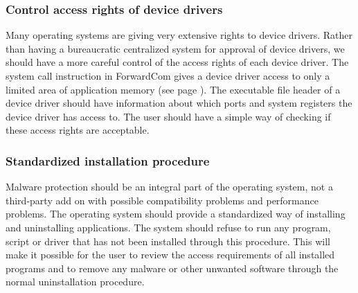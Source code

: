 \documentclass[forwardcom.tex]{subfiles}
\begin{document}
\subsubsection{Control access rights of device drivers} 
Many operating systems are giving very extensive rights to device drivers. Rather than having a bureaucratic centralized system for approval of device drivers, we should have a more careful control of the access rights of each device driver. The system call instruction in ForwardCom gives a device driver access to only a limited area of application memory (see page \pageref{systemCallInstruction}). The executable file header of a device driver should have information about which ports and system registers the device driver has access to. The user should have a simple way of checking if these access rights are acceptable.

\subsubsection{Standardized installation procedure} 
Malware protection should be an integral part of the operating system, not a third-party add on with possible compatibility problems and performance problems. The operating system should provide a standardized way of installing and uninstalling applications. The system should refuse to run any program, script or driver that has not been installed through this procedure. This will make it possible for the user to review the access requirements of all installed programs and to remove any malware or other unwanted software through the normal uninstallation procedure.
\end{document}
